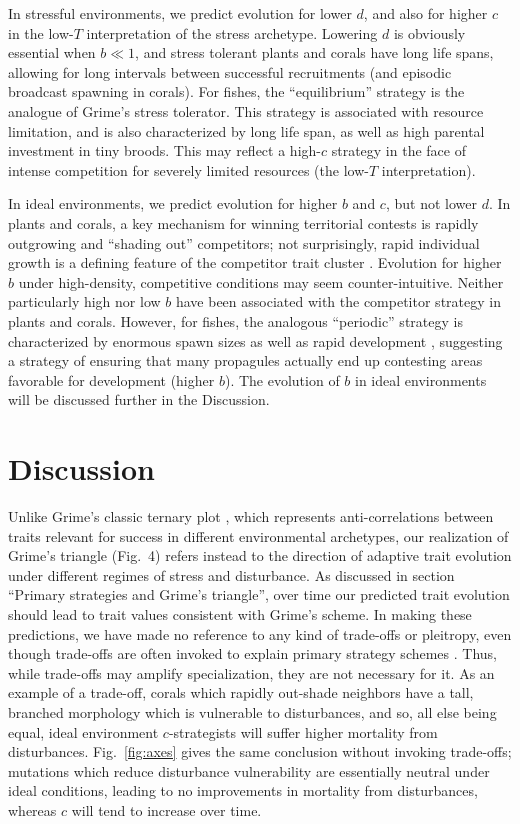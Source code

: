 \documentclass[11pt]{article}
\begin{document}
In stressful environments, we predict evolution for lower $d$, and also  for higher $c$ in the low-$T$ interpretation of the stress archetype. Lowering $d$ is obviously essential when $b\ll 1$, and stress tolerant plants and corals have long life spans, allowing for long intervals between successful recruitments (and episodic broadcast spawning in corals). For fishes, the ``equilibrium'' strategy is the analogue of Grime's stress tolerator. This strategy is associated with resource limitation, and is also characterized by long life span, as well as high parental investment in tiny broods. This may reflect a high-$c$ strategy in the face of intense competition for severely limited resources (the low-$T$ interpretation).

In ideal environments, we predict evolution for higher $b$ and $c$, but not lower $d$. In plants and corals, a key mechanism for winning territorial contests is rapidly outgrowing and ``shading out'' competitors; not surprisingly, rapid individual growth is a defining feature of the competitor trait cluster \citep{grime_1977,darling_2012}. Evolution for higher $b$ under high-density, competitive conditions may seem counter-intuitive. Neither particularly high nor low $b$ have been associated with the competitor strategy in plants and corals. However, for fishes, the analogous ``periodic'' strategy is characterized by enormous spawn sizes as well as rapid development \citep{winemiller_1992,winemiller_2015}, suggesting a strategy of ensuring that many propagules actually end up contesting areas favorable for development (higher $b$). The evolution of $b$ in ideal environments will be discussed further in the Discussion.

\section*{Discussion}

Unlike Grime's classic ternary plot \citep{grime_1974}, which represents anti-correlations between traits relevant for success in different environmental archetypes, our realization of Grime's triangle (Fig.~4) refers instead to the direction of adaptive trait evolution under different regimes of stress and disturbance. As discussed in section ``Primary strategies and Grime's triangle'', over time our predicted trait evolution should lead to trait values consistent with Grime's scheme. In making these predictions, we have made no reference to any kind of trade-offs or pleitropy, even though trade-offs are often invoked to explain primary strategy schemes \citep{macarthur_1967,winemiller_1992,aerts_1999}. Thus, while trade-offs may amplify specialization, they are not necessary for it. As an example of a trade-off, corals which rapidly out-shade neighbors have a tall, branched morphology which is vulnerable to disturbances, and so, all else being equal, ideal environment $c$-strategists will suffer higher mortality from disturbances. Fig.~\ref{fig:axes} gives the same conclusion without invoking trade-offs; mutations which reduce disturbance vulnerability are essentially neutral under ideal conditions, leading to no improvements in mortality from disturbances, whereas $c$ will tend to increase over time. 
\end{document}
